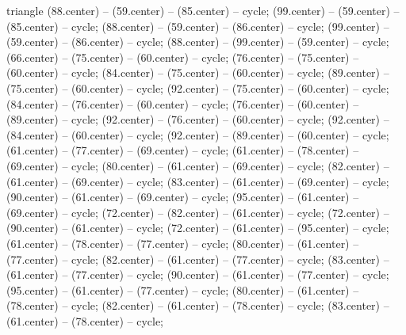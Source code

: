 \begin{pgfonlayer}{triangle}
 (88.center) -- (59.center) -- (85.center) -- cycle; 
 (99.center) -- (59.center) -- (85.center) -- cycle; 
 (88.center) -- (59.center) -- (86.center) -- cycle; 
 (99.center) -- (59.center) -- (86.center) -- cycle; 
 (88.center) -- (99.center) -- (59.center) -- cycle; 
 (66.center) -- (75.center) -- (60.center) -- cycle; 
 (76.center) -- (75.center) -- (60.center) -- cycle; 
 (84.center) -- (75.center) -- (60.center) -- cycle; 
 (89.center) -- (75.center) -- (60.center) -- cycle; 
 (92.center) -- (75.center) -- (60.center) -- cycle; 
 (84.center) -- (76.center) -- (60.center) -- cycle; 
 (76.center) -- (60.center) -- (89.center) -- cycle; 
 (92.center) -- (76.center) -- (60.center) -- cycle; 
 (92.center) -- (84.center) -- (60.center) -- cycle; 
 (92.center) -- (89.center) -- (60.center) -- cycle; 
 (61.center) -- (77.center) -- (69.center) -- cycle; 
 (61.center) -- (78.center) -- (69.center) -- cycle; 
 (80.center) -- (61.center) -- (69.center) -- cycle; 
 (82.center) -- (61.center) -- (69.center) -- cycle; 
 (83.center) -- (61.center) -- (69.center) -- cycle; 
 (90.center) -- (61.center) -- (69.center) -- cycle; 
 (95.center) -- (61.center) -- (69.center) -- cycle; 
 (72.center) -- (82.center) -- (61.center) -- cycle; 
 (72.center) -- (90.center) -- (61.center) -- cycle; 
 (72.center) -- (61.center) -- (95.center) -- cycle; 
 (61.center) -- (78.center) -- (77.center) -- cycle; 
 (80.center) -- (61.center) -- (77.center) -- cycle; 
 (82.center) -- (61.center) -- (77.center) -- cycle; 
 (83.center) -- (61.center) -- (77.center) -- cycle; 
 (90.center) -- (61.center) -- (77.center) -- cycle; 
 (95.center) -- (61.center) -- (77.center) -- cycle; 
 (80.center) -- (61.center) -- (78.center) -- cycle; 
 (82.center) -- (61.center) -- (78.center) -- cycle; 
 (83.center) -- (61.center) -- (78.center) -- cycle; 

\end{pgfonlayer}
